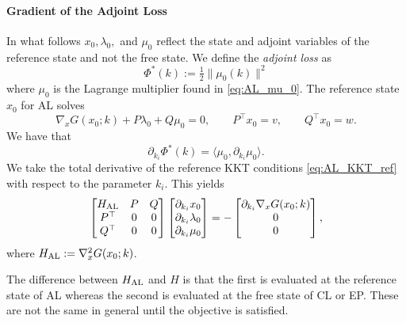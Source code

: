 \documentclass{siamart}
\begin{document}
\paragraph{Gradient of the Adjoint Loss}
In what follows $x_0, \lambda_0,$ and $\mu_0$ reflect the state and adjoint variables of the reference state and not the free state. We define the \textit{adjoint loss}  as 
\[
\Phi^*(k) := \tfrac12\|\mu_0(k)\|^2
\]
where $\mu_0$ is the Lagrange multiplier found in \eqref{eq:AL_mu_0}. The reference state $x_0$ for AL solves 
\begin{equation}
\label{eq:AL_KKT_ref}
\nabla_x G(x_0;k) + P\lambda_0 + Q\mu_0 = 0,
\qquad
P^\top x_0 = v,
\qquad
Q^\top x_0 = w .
\end{equation}
We have that
\[
\partial_{k_i} \Phi^*(k)
=
\langle \mu_0, \partial_{k_i}\mu_0\rangle.
\]
We take the total derivative of the reference KKT conditions \eqref{eq:AL_KKT_ref} with respect to the parameter $k_i$.
This yields
\begin{equation}
\label{eq:AL_kdiff}
\begin{bmatrix}
H_{\rm AL} & P & Q\\
P^\top & 0 & 0\\
Q^\top & 0 & 0
\end{bmatrix}
\begin{bmatrix}
\partial_{k_i} x_0\\
\partial_{k_i} \lambda_0\\
\partial_{k_i} \mu_0
\end{bmatrix}
=
-
\begin{bmatrix}
\partial_{k_i}\nabla_x G(x_0;k)\\
0\\
0
\end{bmatrix},
\end{equation}
where $H_{\rm AL}:=\nabla^2_{x}G(x_0;k)$.
\begin{remark}
The difference between $H_{\rm AL} $ and $H$ is that the  first is evaluated at the reference state of AL whereas the second is evaluated at the free state of CL or EP. These are not the same in general until the objective is satisfied.
\end{remark}
\end{document}
